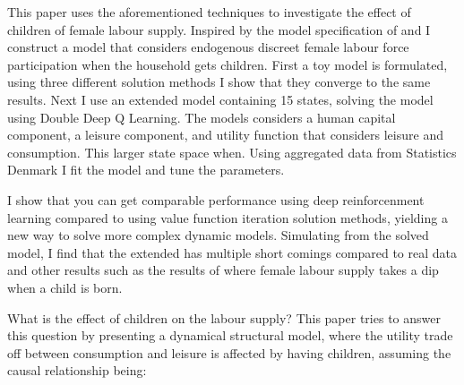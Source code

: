 This paper uses the aforementioned techniques to investigate the effect of children of female labour supply. Inspired by the model specification of \textcite{francesconi_joint_2002} and \textcite{adda_career_2011} I construct a model that considers endogenous discreet female labour force participation when the household gets children. First a toy model is formulated, using three different solution methods I show that they converge to the same results. Next I use an extended model containing 15 states, solving the model using Double Deep Q Learning. The models considers a human capital component, a leisure component, and utility function that considers leisure and consumption. This larger state space when. Using aggregated data from Statistics Denmark I fit the model and tune the parameters.

I show that you can get comparable performance using deep reinforcenment learning compared to using value function iteration solution methods, yielding a new way to solve more complex dynamic models. Simulating from the solved model, I find that the extended has multiple short comings compared to real data and other results such as the results of \textcite{kleven_children_2019} where female labour supply takes a dip when a child is born.  

What is the effect of children on the labour supply? This paper tries to answer this question by presenting a dynamical structural model, where the utility trade off between consumption and leisure is affected by having children, assuming the causal relationship being:


